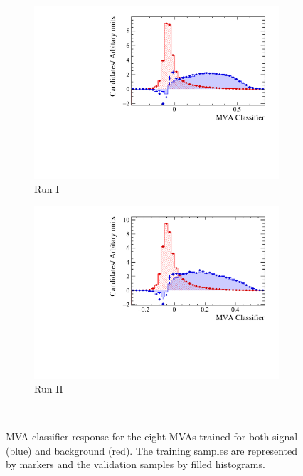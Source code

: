 \begin{figure}[!h]
\begin{subfigure}[t]{0.32\textwidth}
      \includegraphics[width=1.0\textwidth]{figs/Selection/Ds_BDT_classifier_Ds2KPiPi_Run1.pdf}
      \caption{Run I \decay{\Dsp}{\Kp\pim\pip}}
   \end{subfigure}
   \begin{subfigure}[t]{0.32\textwidth}
      \centering
      \includegraphics[width=1.0\textwidth]{figs/Selection/Ds_BDT_classifier_Ds2KPiPi_Run2.pdf}
      \caption{Run II \decay{\Dsp}{\Kp\pim\pip}}
   \end{subfigure}\\
   \caption{MVA classifier response for the eight MVAs trained for both signal (blue) and background (red). The training samples are represented by markers and the validation samples by filled histograms.}
   \label{fig:mvaclassifierresponses}   
\end{figure}

